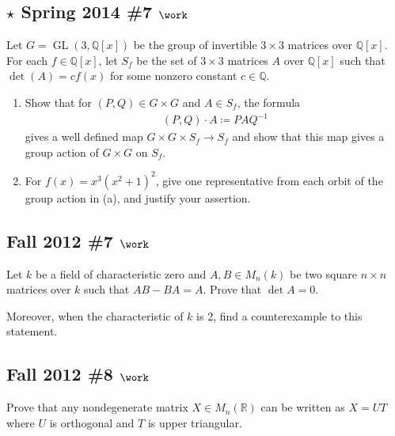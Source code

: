 \hypertarget{star-spring-2014-7-work}{%
\subsection{\texorpdfstring{\(\star\) Spring 2014 \#7
\(\work\)}{\textbackslash star Spring 2014 \#7 \textbackslash work}}\label{star-spring-2014-7-work}}

Let \(G = \operatorname{GL}(3, {\mathbb{Q}}[x])\) be the group of
invertible \(3\times 3\) matrices over \({\mathbb{Q}}[x]\). For each
\(f\in {\mathbb{Q}}[x]\), let \(S_f\) be the set of \(3\times 3\)
matrices \(A\) over \({\mathbb{Q}}[x]\) such that \(\det(A) = c f(x)\)
for some nonzero constant \(c\in {\mathbb{Q}}\).

\begin{enumerate}
\def\labelenumi{\alph{enumi}.}
\item
  Show that for \((P, Q) \in G\times G\) and \(A\in S_f\), the formula
  \begin{align*}
  (P, Q)\cdot A \coloneqq PAQ^{-1}
  \end{align*}
  gives a well defined map \(G\times G \times S_f \to S_f\) and show
  that this map gives a group action of \(G\times G\) on \(S_f\).
\item
  For \(f(x) = x^3(x^2+1)^2\), give one representative from each orbit
  of the group action in (a), and justify your assertion.
\end{enumerate}

\hypertarget{fall-2012-7-work}{%
\subsection{\texorpdfstring{Fall 2012 \#7
\(\work\)}{Fall 2012 \#7 \textbackslash work}}\label{fall-2012-7-work}}

Let \(k\) be a field of characteristic zero and \(A, B \in M_n(k)\) be
two square \(n\times n\) matrices over \(k\) such that \(AB - BA = A\).
Prove that \(\det A = 0\).

Moreover, when the characteristic of \(k\) is 2, find a counterexample
to this statement.

\hypertarget{fall-2012-8-work}{%
\subsection{\texorpdfstring{Fall 2012 \#8
\(\work\)}{Fall 2012 \#8 \textbackslash work}}\label{fall-2012-8-work}}

Prove that any nondegenerate matrix \(X\in M_n({\mathbb{R}})\) can be
written as \(X = UT\) where \(U\) is orthogonal and \(T\) is upper
triangular.


